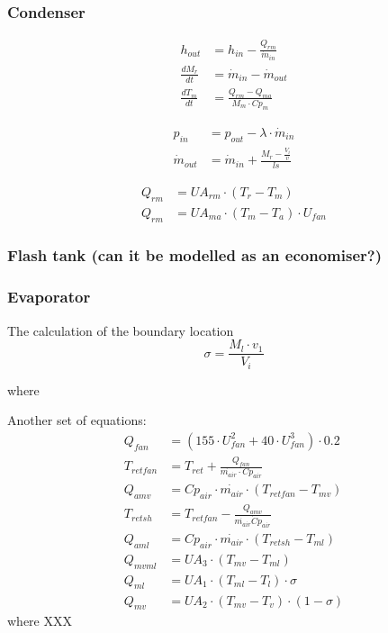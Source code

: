 \subsubsection{Condenser}
\begin{align}
	h_{out} 			& = h_{in} - \frac{Q_{rm}}{\dot{m}_{in}} \\
	\frac{dM_r}{dt} 	& = \dot{m}_{in} - \dot{m}_{out} \\
	\frac{dT_m}{dt} 	& = \frac{Q_{rm} - Q_{ma}}{M_m \cdot Cp_m}
\end{align}

\begin{align}
	p_{in}	 			& = p_{out} - \lambda \cdot \dot{m}_{in} \\
	\dot{m}_{out}		& = \dot{m}_{in} + \frac{M_r - \frac{V_i}{v}}{ls}
\end{align}

\begin{align}
	Q_{rm}	 			& = U A_{rm} \cdot (T_r - T_m)\\
	Q_{rm}	 			& = U A_{ma} \cdot (T_m - T_a)\cdot U_{fan}
\end{align}

\subsubsection{Flash tank (can it be modelled as an economiser?)}

\subsubsection{Evaporator}

The calculation of the boundary location 
\begin{equation}
	\sigma = \frac{M_l \cdot v_1}{V_i}
\end{equation}

where


Another set of equations:
\begin{align}
	Q_{fan} 		& = (155 \cdot U_{fan}^2 + 40 \cdot U_{fan}^3) \cdot 0.2 \\
	T_{retfan} 		& = T_{ret} + \frac{Q_{fan}}{\dot{m_{air}} \cdot Cp_{air}} \\
	Q_{amv} 		& = Cp_{air} \cdot \dot{m_{air}} \cdot (T_{retfan} - T_{mv}) \\
	T_{retsh} 		& = T_{retfan} - \frac{Q_{amv}}{\dot{m_{air}} \dot Cp_{air}} \\
	Q_{aml} 		& = Cp_{air} \cdot \dot{m_{air}} \cdot (T_{retsh} - T_{ml}) \\
	Q_{mvml} 		& = U A_3 \cdot (T_{mv} - T_{ml}) \\
	Q_{ml} 			& = U A_1 \cdot (T_{ml} - T_l) \cdot \sigma\\
	Q_{mv} 			& = U A_2 \cdot (T_{mv} - T_v) \cdot (1- \sigma)
\end{align}
where
XXX

